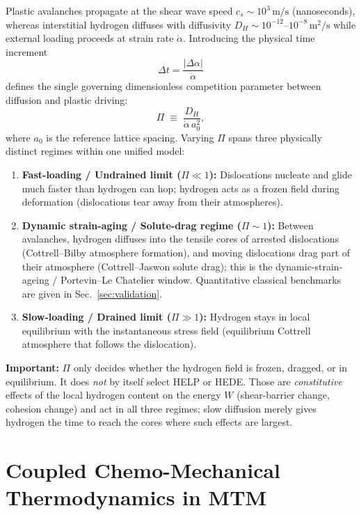 \documentclass[11pt,a4paper]{article}
\begin{document}
Plastic avalanches propagate at the shear wave speed $c_s \sim 10^3\,\mathrm{m/s}$ (nanoseconds), whereas interstitial hydrogen diffuses with diffusivity $D_H \sim 10^{-12}\text{--}10^{-8}\,\mathrm{m^2/s}$ while external loading proceeds at strain rate $\dot{\alpha}$. Introducing the physical time increment
\begin{equation}
  \Delta t = \frac{|\Delta \alpha|}{\dot{\alpha}}
  \label{eq:dt_alpha}
\end{equation}
defines the single governing dimensionless competition parameter between diffusion and plastic driving:
\begin{equation}
  \boxed{\Pi \;\equiv\; \frac{D_H}{\dot{\alpha}\, a_0^2},}
  \label{eq:pi_ratio}
\end{equation}
where $a_0$ is the reference lattice spacing. Varying $\Pi$ spans three physically distinct regimes within one unified model:
\begin{enumerate}[nosep]
  \item \textbf{Fast-loading / Undrained limit ($\Pi \ll 1$):} Dislocations nucleate and glide much faster than hydrogen can hop; hydrogen acts as a frozen field during deformation (dislocations tear away from their atmospheres).
  \item \textbf{Dynamic strain-aging / Solute-drag regime ($\Pi \sim 1$):} Between avalanches, hydrogen diffuses into the tensile cores of arrested dislocations (Cottrell--Bilby atmosphere formation), and moving dislocations drag part of their atmosphere (Cottrell--Jaswon solute drag); this is the dynamic-strain-ageing / Portevin--Le Chatelier window. Quantitative classical benchmarks are given in Sec.~\ref{sec:validation}.
  \item \textbf{Slow-loading / Drained limit ($\Pi \gg 1$):} Hydrogen stays in local equilibrium with the instantaneous stress field (equilibrium Cottrell atmosphere that follows the dislocation).
\end{enumerate}
\noindent\textbf{Important:} $\Pi$ only decides whether the hydrogen field is frozen, dragged, or in equilibrium. It does \emph{not} by itself select HELP or HEDE. Those are \emph{constitutive} effects of the local hydrogen content on the energy $W$ (shear-barrier change, cohesion change) and act in all three regimes; slow diffusion merely gives hydrogen the time to reach the cores where such effects are largest.

\section{Coupled Chemo-Mechanical Thermodynamics in MTM}
\label{sec:thermodynamics}
\end{document}
